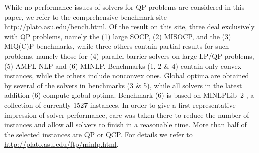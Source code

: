 While no performance issues of solvers for QP problems are considered in
this paper, we refer to the comprehensive benchmark site \url{http://plato.asu.edu/bench.html}.%
Of the result on this site, three deal exclusively with
QP problems, namely the (1) large SOCP, (2) MISOCP, and the (3) MIQ(C)P benchmarks, while three others contain partial results for such problems,
namely those for (4) parallel barrier solvers on large LP/QP problems, (5) AMPL-NLP and (6) MINLP.
Benchmarks (1, 2 \& 4) contain only convex instances, while the others
include nonconvex ones. Global optima are obtained by several of the solvers in
benchmarks (3 \& 5), while all solvers in the latest addition (6) compute
global optima.
Benchmark (6) is based on MINLPLib~2 \cite{Vigerske2014}, a
collection of currently 1527 instances. In order to give a first representative
impression of solver performance, care was taken there to reduce the number of
instances and allow all solvers to finish in a reasonable time.
More than half of the selected instances are QP or QCP.
For details we refer to \url{http://plato.asu.edu/ftp/minlp.html}.

